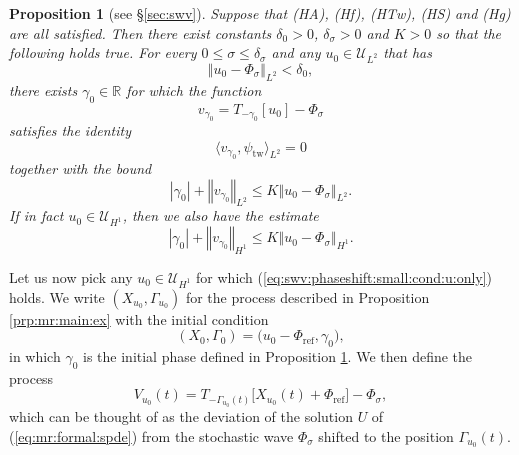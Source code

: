 \documentclass[10pt]{articleHJ}
\newcommand{\Real}{\mathbb{R}}							%
\newcommand{\abs}[1]{\left\vert#1\right\vert}			%
\newcommand{\norm}[1]{\left\Vert#1\right\Vert}		%
\newcommand{\sref}[1]{(\ref{#1})}                       %
\newtheorem{prop}[thm]{Proposition}
\numberwithin{equation}{section}
\begin{document}
\begin{prop}[{see \S\ref{sec:swv}}]
\label{prp:mr:phase:shift}
Suppose that (HA), (Hf), (HTw), (HS) and (Hg) are all satisfied.
Then there exist constants $\delta_0 > 0$, $\delta_{\sigma} > 0$
and $K > 0$
so that the following holds true.
For every $0 \le \sigma \le \delta_{\sigma}$
and any $u_0 \in \mathcal{U}_{L^2} $ that has
\begin{equation}
\label{eq:swv:phaseshift:small:cond:u:only}
\norm{u_0 - \Phi_{\sigma} }_{L^2} < \delta_0,
\end{equation}
there exists
$\gamma_0 \in \Real$
for which the function
\begin{equation}
v_{\gamma_0} = T_{-\gamma_0} [u_0] - \Phi_{\sigma}
\end{equation}
satisfies
the identity
\begin{equation}
\langle v_{\gamma_0} , \psi_{\mathrm{tw}} \rangle_{L^2} = 0
\end{equation}
together with the bound
\begin{equation}
\label{eq:swv:bnds:on:shift:final}
\abs{\gamma_0} + \norm{v_{\gamma_0}}_{L^2} \le
   K \norm{ u_0 - \Phi_{\sigma} }_{L^2} .
\end{equation}
If in fact $u_0 \in \mathcal{U}_{H^1}$,
then we also have the estimate
\begin{equation}
\label{eq:swv:bnds:on:shift:final:h1}
\abs{\gamma_0} + \norm{v_{\gamma_0}}_{H^1} \le
   K \norm{ u_0 - \Phi_{\sigma} }_{H^1} .
\end{equation}
\end{prop}



Let us now pick any $u_0 \in \mathcal{U}_{H^1}$
for which \sref{eq:swv:phaseshift:small:cond:u:only}
holds. We write $(X_{u_0} , \Gamma_{u_0})$
for the process described in Proposition
\ref{prp:mr:main:ex}
with the initial condition
\begin{equation}
(X_0, \Gamma_0) = \big( u_0 - \Phi_{\mathrm{ref}}, \gamma_0 \big),
\end{equation}
in which $\gamma_0$ is the initial phase
defined in Proposition \ref{prp:mr:phase:shift}.
We then define the process
\begin{equation}
\label{eq:mr:def:v:u0}
V_{u_0}(t) = T_{-\Gamma_{u_0}(t) }
  \big[ X_{u_0}(t) + \Phi_{\mathrm{ref}} \big] - \Phi_{\sigma} ,
\end{equation}
which can be thought of as the
deviation of the solution
$U$ of \sref{eq:mr:formal:spde}
from the stochastic wave
$\Phi_{\sigma}$ shifted to the position $\Gamma_{u_0}(t)$.
\end{document}
